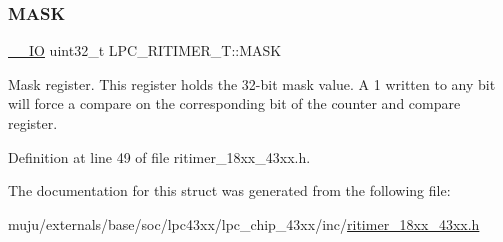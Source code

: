 \mbox{\label{struct_l_p_c___r_i_t_i_m_e_r___t_a7d37943073d12cea677f592c799a1908}} 
\subsubsection{\texorpdfstring{M\+A\+SK}{MASK}}
{\footnotesize\ttfamily \hyperlink{core__sc300_8h_aec43007d9998a0a0e01faede4133d6be}{\+\_\+\+\_\+\+IO} uint32\+\_\+t L\+P\+C\+\_\+\+R\+I\+T\+I\+M\+E\+R\+\_\+\+T\+::\+M\+A\+SK}

Mask register. This register holds the 32-\/bit mask value. A 1 written to any bit will force a compare on the corresponding bit of the counter and compare register. 

Definition at line 49 of file ritimer\+\_\+18xx\+\_\+43xx.\+h.



The documentation for this struct was generated from the following file\+:\begin{DoxyCompactItemize}
\item 
muju/externals/base/soc/lpc43xx/lpc\+\_\+chip\+\_\+43xx/inc/\hyperlink{ritimer__18xx__43xx_8h}{ritimer\+\_\+18xx\+\_\+43xx.\+h}\end{DoxyCompactItemize}
